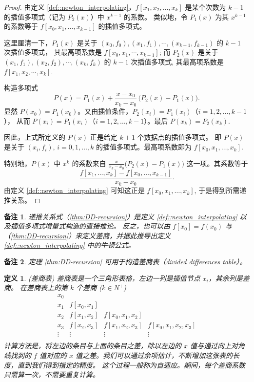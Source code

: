 \documentclass[a4paper]{ctexart}
\newtheorem{remark}{备注}
\newtheorem{definition}[theorem]{定义} %
\numberwithin{theorem}{section}
\numberwithin{equation}{section}
\numberwithin{figure}{section}
\numberwithin{remark}{section}
\begin{document}
\begin{proof}
由定义 \ref{def::newton_interpolating}，$f[x_1,x_2,\ldots,x_k]$ 是某个次数为 $k-1$ 的插值多项式（记为 $P_2(x)$）中 $x^{k-1}$ 的系数。
类似地，令 $P_1(x)$ 为其 $x^{k-1}$ 的系数等于 $f[x_0,x_1,\ldots,x_{k-1}]$ 的插值多项式。

这里厘清一下，$P_1(x)$ 是关于 $(x_0, f_0), (x_1, f_1), \cdots, (x_{k - 1}, f_{k - 1})$ 的 $k - 1$ 次插值多项式，
其最高项系数是 $f[x_0, x_1, \cdots, x_{k - 1}]$; 而 $P_2(x)$ 是关于 $(x_1, f_1), (x_2, f_2), \cdots, (x_k, f_k)$ 的 $k - 1$ 次插值多项式,
其最高项系数是 $f[x_1, x_2, \cdots, x_k]$. 

构造多项式
\[
P(x)=P_1(x)+\frac{x-x_0}{x_k-x_0}\,\bigl(P_2(x)-P_1(x)\bigr).
\]
显然 $P(x_0)=P_1(x_0)$。又由插值条件，$P_2(x_i)=P_1(x_i)$（$i=1,2,\ldots,k-1$），
从而 $P(x_i)=P_1(x_i)$（$i=1,2,\ldots,k-1$）。最后 $P(x_k)=P_2(x_k)$. 

因此，上式所定义的 $P(x)$ 正是给定 $k+1$ 个数据点的插值多项式。
即 $P(x)$ 是关于 $(x_i,f_i)$, $i=0,1,\ldots,k$ 的插值多项式。最高项系数即为 $f[x_0,x_1,\ldots,x_k]$.

特别地，$P(x)$ 中 $x^k$ 的系数来自
$\displaystyle \frac{x}{x_k-x_0}\bigl(P_2(x)-P_1(x)\bigr)$
这一项。其系数等于
\[
\frac{f[x_1,\ldots,x_k]-f[x_0,\ldots,x_{k-1}]}{x_k-x_0}.
\]
由定义 \ref{def::newton_interpolating} 可知这正是 $f[x_0,x_1,\ldots,x_k]$, 于是得到所需递推关系。
\end{proof}

\begin{remark}
递推关系式（\ref{thm:DD-recursion}）是定义 \ref{def::newton_interpolating} 以及插值多项式增量式构造的直接推论。
反之，也可以由 $f[x_0]=f(x_0)$ 与（\ref{thm:DD-recursion}）来定义差商，并据此推导出定义 \ref{def::newton_interpolating} 中的牛顿公式。    
\end{remark}

\begin{remark}
定理 \ref{thm:DD-recursion} 可用于构造差商表（divided differences table）。    
\end{remark}

\begin{definition}
    \label{def::DD-table}
(差商表) 差商表是一个三角形表格，左边一列是插值节点 $x_i$，其余列是差商。
在差商表上的第 $k$ 个差商 ($k \in N^+$) 
\[
\begin{array}{cccc}
x_0 & & & \\
x_1 & f [x_0, x_1] & & \\
x_2 & f [x_1, x_2] & f [x_0 , x_1, x_2] & \\
x_3 & f [x_2, x_3] & f [x_1 , x_2, x_3] & f [x_0 , x_1 , x_2 , x_3 ] \\
\vdots & \vdots & \vdots & \vdots \\
\end{array}
\]
计算方法是，将左边的条目与上面的条目之差，除以左边的 $x$ 值与通过向上对角线找到的 
$f$ 值对应的 $x$ 值之差。我们可以通过余项估计，不断增加这张表的长度，直到我们得到指定的精度。
这个过程一般称为自适应。期间，每个差商系数只需算一次，不需要重复计算。
\end{definition}
\end{document}
